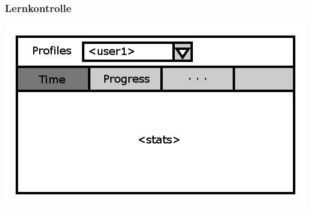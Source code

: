 \documentclass[t]{beamer}
\begin{document}
\begin{frame}
	\frametitle{Lernkontrolle}
	\includegraphics[height=\textheight]{stats.png}
\end{frame}
\end{document}
